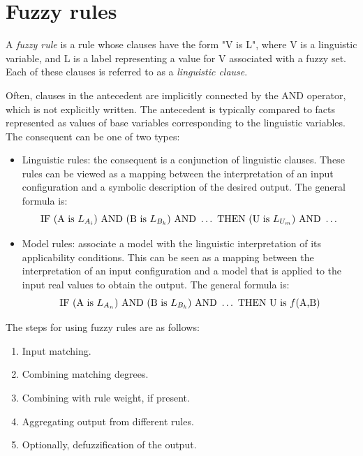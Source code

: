 \documentclass[12pt, a4paper]{report}
\begin{document}
    \section{Fuzzy rules}
    \begin{definition}
        A \emph{fuzzy rule} is a rule whose clauses have the form "V is L", where V is a linguistic variable, and L is a label representing a value for V associated with a fuzzy set.
        Each of these clauses is referred to as a \emph{linguistic clause}. 
    \end{definition}
    Often, clauses in the antecedent are implicitly connected by the AND operator, which is not explicitly written.
    The antecedent is typically compared to facts represented as values of base variables corresponding to the linguistic variables. 
    The consequent can be one of two types:
    \begin{itemize}
        \item Linguistic rules: the consequent is a conjunction of linguistic clauses. 
            These rules can be viewed as a mapping between the interpretation of an input configuration and a symbolic description of the desired output. 
            The general formula is:
            \[\textnormal{IF }(\textnormal{A is }L_{A_i})\textnormal{ AND }(\textnormal{B is }L_{B_k})\textnormal{ AND }\dots\textnormal{ THEN }(\textnormal{U is }L_{U_m})\textnormal{ AND }\dots\]
        \item Model rules: associate a model with the linguistic interpretation of its applicability conditions. 
            This can be seen as a mapping between the interpretation of an input configuration and a model that is applied to the input real values to obtain the output. 
            The general formula is:
            \[\textnormal{IF }(\textnormal{A is }L_{A_n})\textnormal{ AND }(\textnormal{B is }L_{B_k})\textnormal{ AND }\dots\textnormal{ THEN } \textnormal{U is } f(\textnormal{A,B})\]
    \end{itemize}
    The steps for using fuzzy rules are as follows:
    \begin{enumerate}
        \item Input matching.
        \item Combining matching degrees.
        \item Combining with rule weight, if present.
        \item Aggregating output from different rules.
        \item Optionally, defuzzification of the output.
    \end{enumerate}
\end{document}
